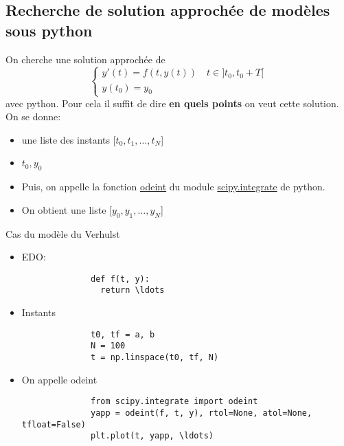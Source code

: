 \subsection{Recherche de solution approchée de modèles sous python}
On cherche une solution approchée de 
\[
\begin{cases}
    y'(t) = f(t, y(t)) \quad t \in ]t_0, t_0 + T[\\
    y(t_0) = y_0
\end{cases}
\] avec python. Pour cela il suffit de dire \textbf{en quels points} on veut cette solution.\\
On se donne:
\begin{itemize}
    \item une liste des instants [$t_0, t_1, \ldots, t_N$]
    \item $t_0, y_0$
    \item Puis, on appelle la fonction \underline{odeint} du module \underline{scipy.integrate} de python.
    \item On obtient une liste [$y_0, y_1, \ldots, y_N$]
\end{itemize}
\begin{eg}
   Cas du modèle du Verhulst 
   \begin{itemize}
       \item EDO:
           \begin{lstlisting}
              def f(t, y):
                return \ldots
           \end{lstlisting}
       \item Instants
           \begin{lstlisting}
              t0, tf = a, b 
              N = 100
              t = np.linspace(t0, tf, N)
           \end{lstlisting}
       \item On appelle odeint
           \begin{lstlisting}
              from scipy.integrate import odeint
              yapp = odeint(f, t, y), rtol=None, atol=None, tfloat=False)
              plt.plot(t, yapp, \ldots)
           \end{lstlisting}
   \end{itemize}
\end{eg}
